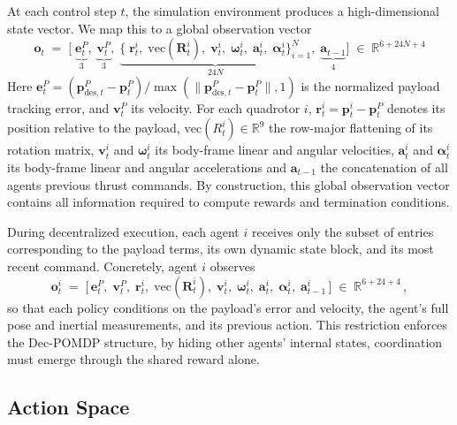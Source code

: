 At each control step \(t\), the simulation environment produces a high-dimensional state vector. We map this to a global observation vector 
\begin{equation}
\mathbf{o}_t \;=\; \bigl[\;\underbrace{\mathbf{e}^P_t}_{3},\;\underbrace{\mathbf{v}^P_t}_{3},\;\underbrace{\{\;\mathbf{r}^i_t,\;\mathrm{vec}(\mathbf{R}^i_t),\;\mathbf{v}^i_t,\;\boldsymbol{\omega}^i_t,\;\mathbf{a}^i_t,\;\boldsymbol{\alpha}^i_t\}_{i=1}^N}_{24N},\;\underbrace{\mathbf{a}_{t-1}}_{4}\bigr] \;\in\;\mathbb{R}^{6 + 24N + 4}
\end{equation}
Here \(\mathbf{e}^P_t = (\mathbf{p}^P_{\mathrm{des},t}-\mathbf{p}^P_t)/\max(\|\mathbf{p}^P_{\mathrm{des},t}-\mathbf{p}^P_t\|,1)\) is the normalized payload tracking error, and \(\mathbf{v}^P_t\) its velocity.  For each quadrotor \(i\), \(\mathbf{r}^i_t=\mathbf{p}^i_t-\mathbf{p}^P_t\) denotes its position relative to the payload, \(\mathrm{vec}(R^i_t)\in\mathbb{R}^9\) the row-major flattening of its rotation matrix, \(\mathbf{v}^i_t\) and \(\boldsymbol{\omega}^i_t\) its body-frame linear and angular velocities, \(\mathbf{a}^i_t\) and \(\boldsymbol{\alpha}^i_t\) its body-frame linear and angular accelerations and \(\mathbf{a}_{t-1}\) the concatenation of all agents previous thrust commands.  By construction, this global observation vector contains all information required to compute rewards and termination conditions.

During decentralized execution, each agent \(i\) receives only the subset of entries corresponding to the payload terms, its own dynamic state block, and its most recent command.  Concretely, agent \(i\) observes
\begin{equation}
\mathbf{o}^i_t 
\;=\;
\bigl[\,
\mathbf{e}^P_t,\;\mathbf{v}^P_t,\;\mathbf{r}^i_t,\;\mathrm{vec}(\mathbf{R}^i_t),\;\mathbf{v}^i_t,\;\boldsymbol{\omega}^i_t,\;\mathbf{a}^i_t,\;\boldsymbol{\alpha}^i_t,\;\mathbf{a}^i_{t-1}
\,\bigr]\;\in\;\mathbb{R}^{6 + 24 + 4}\,,
\end{equation}
so that each policy conditions on the payload's error and velocity, the agent's full pose and inertial measurements, and its previous action.  This restriction enforces the Dec-POMDP structure, by hiding other agents' internal states, coordination must emerge through the shared reward alone.

\subsection{Action Space}

